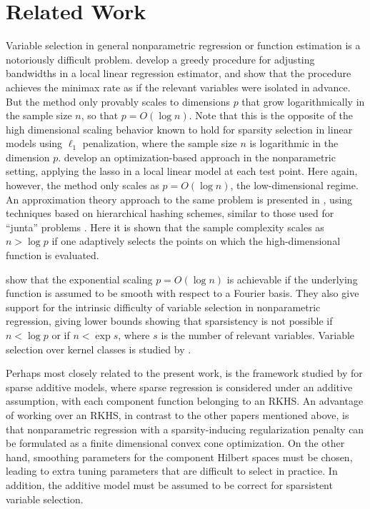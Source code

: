 \section{Related Work}

Variable selection in general nonparametric regression or function
estimation is a notoriously difficult problem. \citet{lafferty2008rodeo} develop a greedy procedure for
adjusting bandwidths in a local linear regression estimator,
and show that the procedure achieves the minimax rate
as if the relevant variables were isolated in advance.
But the method only provably scales to dimensions $p$ that 
grow logarithmically in the sample size $n$, so that $p = O(\log n)$.  Note that this
is the opposite of the high dimensional scaling behavior
known to hold for sparsity selection in linear models
using $\ell_1$ penalization, where the sample size $n$
is logarithmic in the dimension $p$. \citet{bertin:08}
develop an optimization-based approach in
the nonparametric setting, applying the lasso
in a local linear model at each test point.  Here again,
however, the method only scales as $p = O(\log n)$,
the low-dimensional regime.
An approximation theory approach to the same
problem is presented in \cite{devore:11}, 
using techniques based on hierarchical hashing schemes,
similar to those used for ``junta'' problems \cite{mossel:04}.
Here it is shown that the sample complexity scales as $n > \log p$ 
if one adaptively selects the points on
which the high-dimensional function is evaluated.

\citet{dalalyan:12} show that the exponential scaling $p=O(\log n)$ is achievable if the underlying function is assumed to be smooth with respect to a Fourier basis. They also give
support for the intrinsic difficulty of variable
selection in nonparametric regression, giving lower bounds 
showing that sparsistency is not possible if $n < \log p$ or if $n <
\exp s$, where $s$ is the number of relevant variables.
Variable selection over kernel classes is studied
by \citet{Kolch:10}.  

Perhaps most closely related to the present work, is the framework
studied by \cite{Raskutti:12} for sparse additive models, where sparse
regression is considered under an additive assumption, with each
component function belonging to an RKHS.  An advantage of working over
an RKHS, in contrast to the other papers mentioned above, is that
nonparametric regression with a sparsity-inducing regularization penalty can be
formulated as a finite dimensional convex cone optimization.
On the other hand, 
smoothing parameters for the component Hilbert spaces
must be chosen, leading to extra tuning parameters
that are difficult to select in practice.  In addition, 
the additive model must be assumed to
be correct for sparsistent variable selection.

